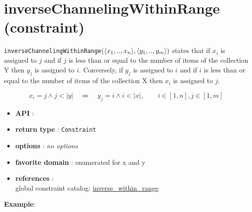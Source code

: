 \label{inversechannelingwithinrange}
\hypertarget{inversechannelingwithinrange}{}

\section{inverseChannelingWithinRange (constraint)}\label{inversechannelingwithinrange:inversechannelingconstraintwithinrange}\hypertarget{inversechannelingwithinrange:inversechannelingconstraintwithinrange}{}
\begin{notedef}
  \texttt{inverseChannelingWithinRange}$(\langle x_1,..,x_n\rangle,\langle y_1,..,y_m\rangle)$ states that
if $x_i$ is assigned to $j$ and if $j$ is less than or equal to the number of items of the collection Y then $y_j$ is assigned to $i$.
Conversely, if $y_j$ is assigned to $i$ and if $i$ is less than or equal to the number of items of the collection X then $x_i$ is assigned to $j$.

$$x_i = j \wedge j < |y| \quad\iff\quad y_j = i \wedge i < |x|,\qquad i \in[1,n],  j\in[1,m]$$
\end{notedef}
\begin{itemize}
	\item \textbf{API} : 
	\item \textbf{return type} : \texttt{Constraint}
	\item \textbf{options} : \emph{no options}
	\item \textbf{favorite domain} : enumerated for x and y
	\item \textbf{references} :\\
      global constraint catalog: \href{http://www.emn.fr/z-info/sdemasse/gccat/Cinverse_within_range.html}{inverse\_within\_range}
\end{itemize}

\textbf{Example}:

